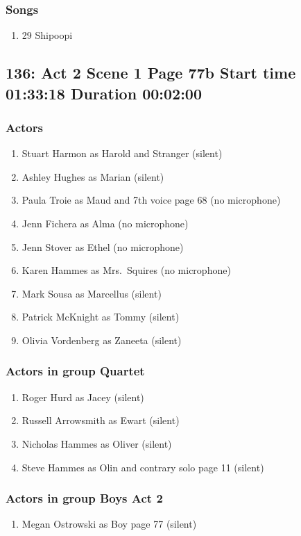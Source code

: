 \subsubsection{Songs}
\begin{enumerate}
\item 29 Shipoopi
\end{enumerate}
\subsection{136: Act 2 Scene 1 Page 77b Start time 01:33:18 Duration 00:02:00}

\subsubsection{Actors}
\begin{enumerate}
\item Stuart Harmon as Harold and Stranger (silent)
\item Ashley Hughes as Marian (silent)
\item Paula Troie as Maud and 7th voice page 68 (no microphone)
\item Jenn Fichera as Alma (no microphone)
\item Jenn Stover as Ethel (no microphone)
\item Karen Hammes as Mrs.~Squires (no microphone)
\item Mark Sousa as Marcellus (silent)
\item Patrick McKnight as Tommy (silent)
\item Olivia Vordenberg as Zaneeta (silent)
\end{enumerate}
\subsubsection{Actors in group Quartet}
\begin{enumerate}
\item Roger Hurd as Jacey (silent)
\item Russell Arrowsmith as Ewart (silent)
\item Nicholas Hammes as Oliver (silent)
\item Steve Hammes as Olin and contrary solo page 11 (silent)
\end{enumerate}
\subsubsection{Actors in group Boys Act 2}
\begin{enumerate}
\item Megan Ostrowski as Boy page 77 (silent)
\end{enumerate}

